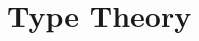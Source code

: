 \documentclass[./Thesis.tex]{subfiles}
\begin{document}
\chapter{Type Theory}
\label{chap:type-theory}
\end{document}
